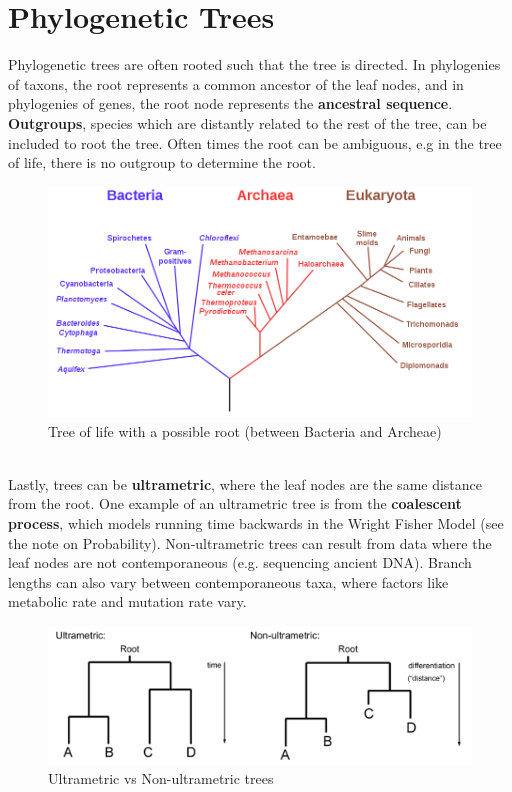 \documentclass[12pt]{article}
\begin{document}
\section{Phylogenetic Trees}
Phylogenetic trees are often rooted such that the tree is directed. In phylogenies of taxons, the root represents a common ancestor of the leaf nodes, and in phylogenies of genes, the root node represents the \textbf{ancestral sequence}. \textbf{Outgroups}, species which are distantly related to the rest of the tree, can be included to root the tree. Often times the root can be ambiguous, e.g in the tree of life, there is no outgroup to determine the root.\\[10pt]
\begin{figure}[h]
    \centering
    \includegraphics[width=.6\linewidth]{tree_of_life_rooted.png}
    \caption{Tree of life with a possible root (between Bacteria and Archeae)}
    \label{fig:life}
\end{figure}\\[10pt]
Lastly, trees can be \textbf{ultrametric}, where the leaf nodes are the same distance from the root. 
One example of an ultrametric tree is from the \textbf{coalescent process}, which models running time backwards in the Wright Fisher Model (see the note on Probability). Non-ultrametric trees can result from data where the leaf nodes are not contemporaneous (e.g. sequencing ancient DNA). Branch lengths can also vary between contemporaneous taxa, where factors like metabolic rate and mutation rate vary.
\begin{figure}[h]
    \centering
    \includegraphics[width=.85\linewidth]{ultrametric.png}
    \caption{Ultrametric vs Non-ultrametric trees}
    \label{fig:ultra}
\end{figure}
\end{document}
